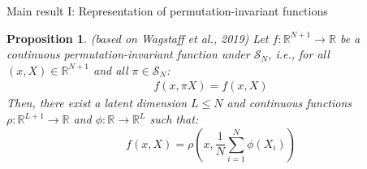\documentclass[aspectratio=169,10pt]{beamer}
\newtheorem{proposition}{Proposition}
\begin{document}
		\begin{frame}{Main result I: Representation of permutation-invariant functions }
		
			\begin{proposition}{ (based on Wagstaff et al., 2019)}
				Let  $f:\mathbb{R}^{N+1} \rightarrow \mathbb{R}$ be a continuous permutation-invariant function under $\mathcal{S}_N$, i.e., for all $(x,X) \in \mathbb{R}^{N+1}$ and all $\pi \in \mathcal{S}_N$:
				\begin{align*}
					f(x, \pi X) = f(x,X)
				\end{align*}
				Then, there exist a latent dimension $L\leq N$ and continuous functions $\rho : \mathbb{R}^{L+1}\rightarrow \mathbb{R}$ and $\phi: \mathbb{R} \rightarrow \mathbb{R}^L$ such that:
				\begin{equation*}
					f(x,X) = \rho \left(x,\frac{1}{N}\sum_{i=1}^N\phi(X_i)\right)
				\end{equation*}
				\vspace{-0.1in}
			\end{proposition}
		\end{frame}
	
\end{document}
